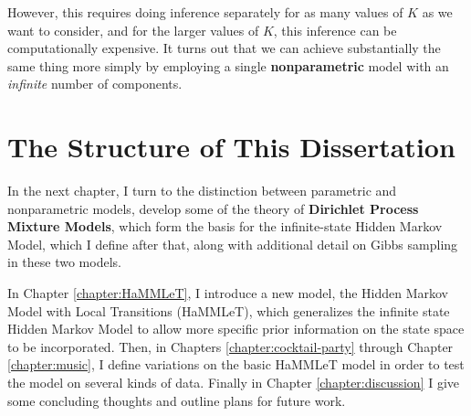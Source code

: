 However, this requires doing inference separately for as many values
of $K$ as we want to consider, and for the larger values of $K$, this
inference can be computationally expensive.  It turns out that we can
achieve substantially the same thing more simply by employing a single
{\bf nonparametric} model with an {\em infinite} number of
components.  

\section{The Structure of This Dissertation}

In the next chapter, I turn to the distinction between parametric and
nonparametric models, develop some of the theory of {\bf Dirichlet Process Mixture
  Models}, which form the basis for the infinite-state Hidden Markov
Model, which I define after that, along with additional detail on
Gibbs sampling in these two models.

In Chapter \ref{chapter:HaMMLeT}, I introduce a new model, the Hidden
Markov Model with Local Transitions (HaMMLeT), which generalizes the
infinite state Hidden Markov Model to allow more specific prior
information on the state space to be incorporated.  Then, in Chapters
\ref{chapter:cocktail-party} through Chapter \ref{chapter:music}, I
define variations on the basic HaMMLeT model in order to test the
model on several kinds of data.  Finally in Chapter
\ref{chapter:discussion} I give some concluding thoughts and outline
plans for future work.
